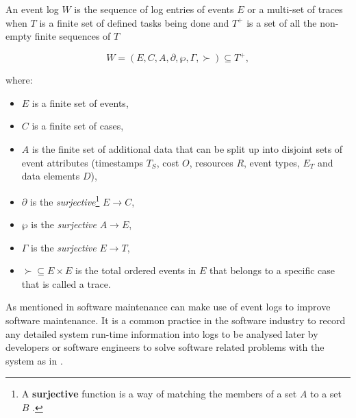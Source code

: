 An event log $W$ is the sequence of log entries of events $E$ or a multi-set of traces when $T$ is a finite set of defined tasks being done and $T^+$ is a set of all the non-empty finite sequences of $T$ \cite{Kherbouche2017}

\begin{equation}
	\label{eq:LogEvent}
	W = (E, C, A, \partial, \wp, \Gamma, \succ) \subseteq T^+,
\end{equation}

where:

\begin{itemize}
	\item $E$ is a finite set of events,
	\item $C$ is a finite set of cases,
	\item $A$ is the finite set of additional data that can be split up into disjoint sets of event attributes (timestamps $T_S$, cost $O$, resources $R$, event types, $E_T$ and data elements $D$),
	\item $\partial$ is the \textit{surjective}\footnote{\label{ftn:Surjective}A \textbf{surjective} function is a way of matching the members of a set $A$ to a set $B$ \cite{Szendrei1990}.} $E\rightarrow C$,
	\item $\wp$ is the \textit{surjective} $A\rightarrow E$,
	\item $\Gamma$ is the \textit{surjective} $E\rightarrow T$,
	\item $\succ \subseteq E\times E$ is the total ordered events in $E$ that belongs to a specific case that is called a trace.
\end{itemize}

As mentioned in  software maintenance can make use of event logs to improve software maintenance. It is a common practice in the software industry to record any detailed system run-time information into logs to be analysed later by developers or software engineers to solve software related problems with the system as in  \cite{Zhu2019}.

